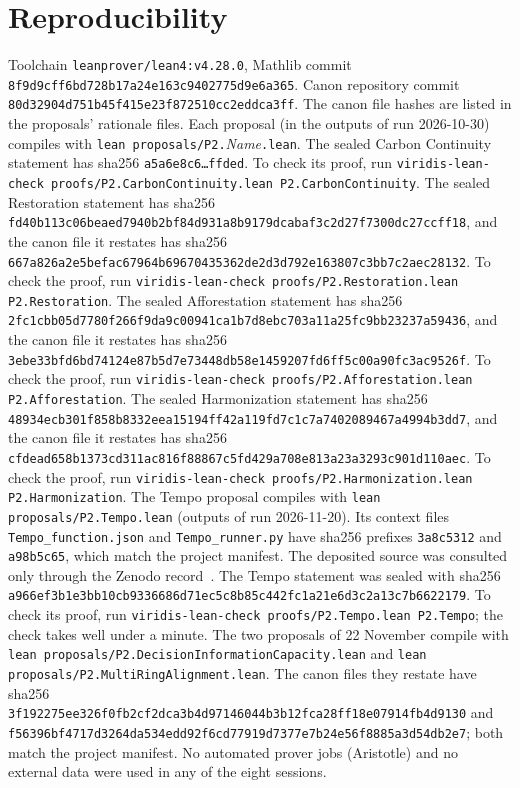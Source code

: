 \documentclass[11pt]{article}
\theoremstyle{definition}
\theoremstyle{remark}
\begin{document}
\section{Reproducibility}
Toolchain \texttt{leanprover/lean4:v4.28.0}, Mathlib commit \texttt{8f9d9cff6bd728b17a24e163c9402775d9e6a365}.
Canon repository commit \texttt{80d32904d751b45f415e23f872510cc2eddca3ff}. The canon file hashes are listed in the proposals' rationale files.
Each proposal (in the outputs of run 2026-10-30) compiles with \texttt{lean proposals/P2.}\textit{Name}\texttt{.lean}.
The sealed Carbon Continuity statement has sha256 \texttt{a5a6e8c6\ldots ffded}. To check its proof, run
\texttt{viridis-lean-check proofs/P2.CarbonContinuity.lean P2.CarbonContinuity}.
The sealed Restoration statement has sha256 \texttt{fd40b113c06beaed7940b2bf84d931a8b9179dcabaf3c2d27f7300dc27ccff18},
and the canon file it restates has sha256 \texttt{667a826a2e5befac67964b69670435362de2d3d792e163807c3bb7c2aec28132}.
To check the proof, run \texttt{viridis-lean-check proofs/P2.Restoration.lean P2.Restoration}.
The sealed Afforestation statement has sha256 \texttt{2fc1cbb05d7780f266f9da9c00941ca1b7d8ebc703a11a25fc9bb23237a59436},
and the canon file it restates has sha256 \texttt{3ebe33bfd6bd74124e87b5d7e73448db58e1459207fd6ff5c00a90fc3ac9526f}.
To check the proof, run \texttt{viridis-lean-check proofs/P2.Afforestation.lean P2.Afforestation}.
The sealed Harmonization statement has sha256 \texttt{48934ecb301f858b8332eea15194ff42a119fd7c1c7a7402089467a4994b3dd7},
and the canon file it restates has sha256 \texttt{cfdead658b1373cd311ac816f88867c5fd429a708e813a23a3293c901d110aec}.
To check the proof, run \texttt{viridis-lean-check proofs/P2.Harmonization.lean P2.Harmonization}.
The Tempo proposal compiles with \texttt{lean proposals/P2.Tempo.lean} (outputs of run 2026-11-20). Its context files
\texttt{Tempo\_function.json} and \texttt{Tempo\_runner.py} have sha256 prefixes \texttt{3a8c5312} and \texttt{a98b5c65}, which match
the project manifest. The deposited source was consulted only through the Zenodo record~\cite{HartTempo2026}.
The Tempo statement was sealed with sha256 \texttt{a966ef3b1e3bb10cb9336686d71ec5c8b85c442fc1a21e6d3c2a13c7b6622179}.
To check its proof, run \texttt{viridis-lean-check proofs/P2.Tempo.lean P2.Tempo}; the check takes well under a minute.
The two proposals of 22 November compile with \texttt{lean proposals/P2.DecisionInformationCapacity.lean} and
\texttt{lean proposals/P2.MultiRingAlignment.lean}. The canon files they restate have sha256
\texttt{3f192275ee326f0fb2cf2dca3b4d97146044b3b12fca28ff18e07914fb4d9130} and
\texttt{f56396bf4717d3264da534edd92f6cd77919d7377e7b24e56f8885a3d54db2e7}; both match the project manifest.
No automated prover jobs (Aristotle) and no external data were used in any of the eight sessions.
\end{document}
